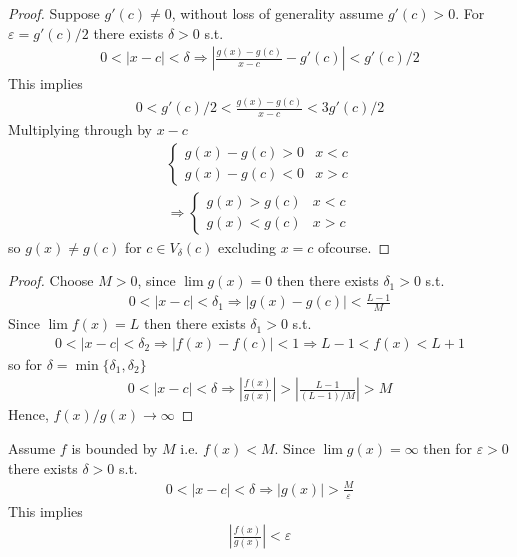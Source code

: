 \begin{proof}
    Suppose $g'(c)\neq 0$, without loss of generality assume 
    $g'(c)>0$. For $\varepsilon=g'(c)/2$ there exists $\delta>0$
    s.t. 
    \begin{align*}
        0<|x-c|<\delta \Rightarrow |\frac{g(x)-g(c)}{x-c}-g'(c)| < g'(c)/2
    \end{align*}
    This implies 
    \begin{align*}
        0<g'(c)/2 < \frac{g(x)-g(c)}{x-c} < 3g'(c)/2
    \end{align*}
    Multiplying through by $x-c$
    \begin{align*}
        \begin{cases}
            g(x)-g(c) > 0 & x < c \\
            g(x)-g(c) < 0 & x > c
        \end{cases} \\
        \Rightarrow \begin{cases}
            g(x) > g(c) & x < c \\
            g(x) < g(c) & x > c
        \end{cases}
    \end{align*}
    so $g(x)\neq g(c)$ for $c \in V_\delta(c)$ excluding 
    $x=c$ ofcourse.
\end{proof}

\begin{proof}
    Choose $M>0$,
    since $\lim g(x) = 0$ then there exists $\delta_1>0$ s.t. 
    \begin{align*}
        0<|x-c|<\delta_1 \Rightarrow |g(x) - g(c)| < \frac{L-1}{M}
    \end{align*}
    Since $\lim f(x)=L$ then there exists $\delta_1>0$ s.t. 
    \begin{align*}
        0<|x-c|<\delta_2 \Rightarrow |f(x) - f(c)| < 1 \Rightarrow L-1<f(x)<L+1
    \end{align*}
    so for $\delta=\min\{\delta_1,\delta_2\}$
    \begin{align*}
        0<|x-c|<\delta \Rightarrow |\frac{f(x)}{g(x)}| > |\frac{L-1}{(L-1)/M}| > M
    \end{align*}
    Hence, $f(x)/g(x) \rightarrow \infty$
\end{proof}

Assume $f$ is bounded by $M$ i.e. $f(x)<M$. Since 
$\lim g(x) = \infty$ then for $\varepsilon>0$ there exists 
$\delta>0$ s.t. 
\begin{align*}
    0<|x-c|<\delta \Rightarrow |g(x)|>\frac{M}{\varepsilon}
\end{align*}
This implies 
\begin{align*}
    |\frac{f(x)}{g(x)}| < \varepsilon
\end{align*}


